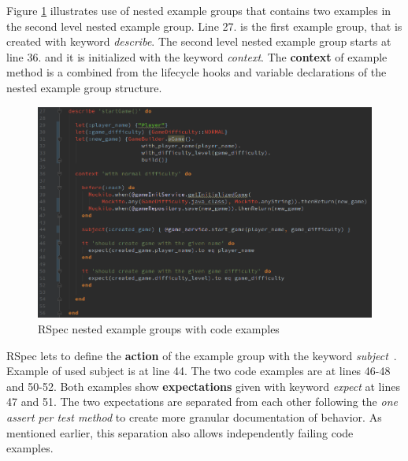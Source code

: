     Figure \ref{fig:rspec-example} illustrates use of nested example groups that contains two examples in the second
    level nested example group. Line 27. is the first example group, that is created with keyword \textit{describe}. The second
    level nested example group starts at line 36. and it is initialized with the keyword \textit{context}. The \textbf{context} of
    example method is a combined from the lifecycle hooks and variable declarations of the nested example group structure.
    \begin{figure}[ht]
      \begin{center}
        \includegraphics[width=13.7cm]{images/rspec-example.png}
        \caption{RSpec nested example groups with code examples}
        \label{fig:rspec-example}
      \end{center}
    \end{figure}
    RSpec lets to define the \textbf{action} of the example group with the keyword \textit{subject}~\cite{rspec-subject}. Example of used subject is at
    line 44. The two code examples are at lines 46-48 and 50-52.  Both examples show \textbf{expectations} given with keyword \textit{expect}
    at lines 47 and 51. The two expectations are separated from each other following the \textit{one assert per test method}
    to create more granular documentation of behavior. As mentioned earlier, this separation also allows independently failing code examples.

